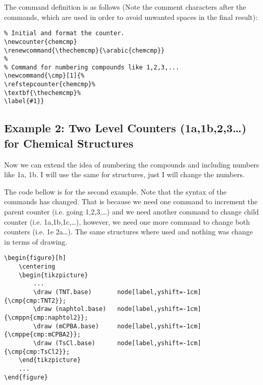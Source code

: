 \documentclass[
]{scrartcl}
\begin{document}
%
The  command definition is as follows (Note the comment characters
    after the commands, which are used in order to avoid unwanted spaces in the
    final result):
\begin{lstlisting}
% Initial and format the counter.
\newcounter{chemcmp}
\renewcommand{\thechemcmp}{\arabic{chemcmp}}
%
% Command for numbering compounds like 1,2,3,...
\newcommand{\cmp}[1]{%
\refstepcounter{chemcmp}%
\textbf{\thechemcmp}%
\label{#1}}
\end{lstlisting}

%
\subsection{Example 2: Two Level Counters (1a,1b,2,3\ldots) for Chemical
    Structures}

%
Now we can extend the idea of numbering the compounds and including numbers like
    1a, 1b. I will use the same for structures, just I will change the numbers.

%

%
The code bellow is for the second example.
%
Note that the syntax of the commands has changed.
%
That is because we need one command to increment the parent counter (i.e. going
    1,2,3,\ldots) and we need another command to change child counter (i.e.
    1a,1b,1c,\ldots), however, we need one more command to change both counters
    (i.e. 1e \ce{->} 2a\ldots).
%
The same structures where used and nothing was change in terms of drawing.
%
\begin{lstlisting}
\begin{figure}[h]
    \centering
    \begin{tikzpicture}
        ...
        \draw (TNT.base)       node[label,yshift=-1cm]{\cmp{cmp:TNT2}};
        \draw (naphtol.base)   node[label,yshift=-1cm]{\cmppn{cmp:naphtol2}};
        \draw (mCPBA.base)     node[label,yshift=-1cm]{\cmppe{cmp:mCPBA2}};
        \draw (TsCl.base)      node[label,yshift=-1cm]{\cmp{cmp:TsCl2}};
    \end{tikzpicture}
    ...
\end{figure}
\end{lstlisting}
\end{document}
